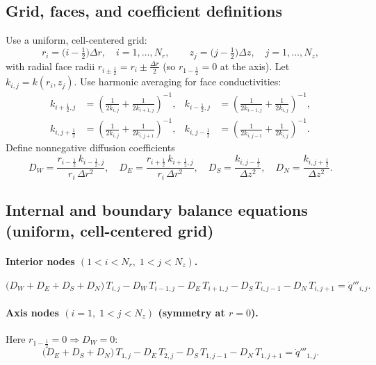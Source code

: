 \documentclass[11pt]{article}
\begin{document}
\subsection*{Grid, faces, and coefficient definitions}
Use a uniform, cell-centered grid:
\begin{equation}
r_i=\Big(i-\tfrac{1}{2}\Big)\Delta r,\quad i=1,\dots,N_r, 
\qquad
z_j=\Big(j-\tfrac{1}{2}\Big)\Delta z,\quad j=1,\dots,N_z,
\end{equation}
with radial face radii \(r_{i\pm\frac12}=r_i\pm\frac{\Delta r}{2}\) (so \(r_{1-\frac12}=0\) at the axis). Let \(k_{i,j}=k(r_i,z_j)\). Use harmonic averaging for face conductivities:
\begin{align}
k_{i+\frac12,j}&=\left(\frac{1}{2k_{i,j}}+\frac{1}{2k_{i+1,j}}\right)^{-1},&
k_{i-\frac12,j}&=\left(\frac{1}{2k_{i-1,j}}+\frac{1}{2k_{i,j}}\right)^{-1},\\
k_{i,j+\frac12}&=\left(\frac{1}{2k_{i,j}}+\frac{1}{2k_{i,j+1}}\right)^{-1},&
k_{i,j-\frac12}&=\left(\frac{1}{2k_{i,j-1}}+\frac{1}{2k_{i,j}}\right)^{-1}.
\end{align}
Define nonnegative diffusion coefficients
\begin{equation}
D_W=\frac{r_{i-\frac12}\,k_{i-\frac12,j}}{r_i\,\Delta r^2},\quad
D_E=\frac{r_{i+\frac12}\,k_{i+\frac12,j}}{r_i\,\Delta r^2},\quad
D_S=\frac{k_{i,j-\frac12}}{\Delta z^2},\quad
D_N=\frac{k_{i,j+\frac12}}{\Delta z^2}.
\end{equation}

\subsection*{Internal and boundary balance equations (uniform, cell-centered grid)}

\paragraph{Interior nodes \((1<i<N_r,\;1<j<N_z)\).}
\begin{equation}\tag{E1}
\big(D_W{+}D_E{+}D_S{+}D_N\big)\,T_{i,j}
- D_W\,T_{i-1,j}
- D_E\,T_{i+1,j}
- D_S\,T_{i,j-1}
- D_N\,T_{i,j+1}
= \dot q'''_{i,j}.
\end{equation}

\paragraph{Axis nodes \((i=1,\;1<j<N_z)\) (symmetry at \(r=0\)).}
Here \(r_{1-\frac12}=0\Rightarrow D_W=0\):
\begin{equation}\tag{E2}
\big(D_E{+}D_S{+}D_N\big)\,T_{1,j}
- D_E\,T_{2,j}
- D_S\,T_{1,j-1}
- D_N\,T_{1,j+1}
= \dot q'''_{1,j}.
\end{equation}
\end{document}
